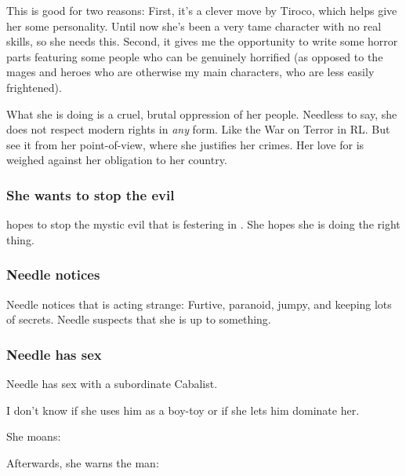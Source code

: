 This is good for two reasons: 
First, it's a clever move by Tiroco, which helps give her some personality. Until now she's been a very tame character with no real skills, so she needs this. 
Second, it gives me the opportunity to write some horror parts featuring some  people who can be genuinely horrified (as opposed to the mages and heroes who are otherwise my main characters, who are less easily frightened). 

What she is doing is a cruel, brutal oppression of her people. Needless to say, she does not respect modern \human{} rights in \emph{any} form. Like the War on Terror in RL. But see it from her point-of-view, where she justifies her crimes. Her love for \Icor{} is weighed against her obligation to her country. 





\subsubsection{She wants to stop the evil}
\Tiroco{} hopes to stop the mystic evil that is festering in \Malcur. 
She hopes she is doing the right thing. 









\subsubsection{Needle notices \Tiroco}
Needle notices that \Tiroco{} is acting strange: 
Furtive, paranoid, jumpy, and keeping lots of secrets. 
Needle suspects that she is up to something. 





\subsubsection{Needle has sex}
Needle has sex with a subordinate Cabalist. 

I don't know if she uses him as a boy-toy or if she lets him dominate her. 

She moans: 

Afterwards, she warns the man: 





